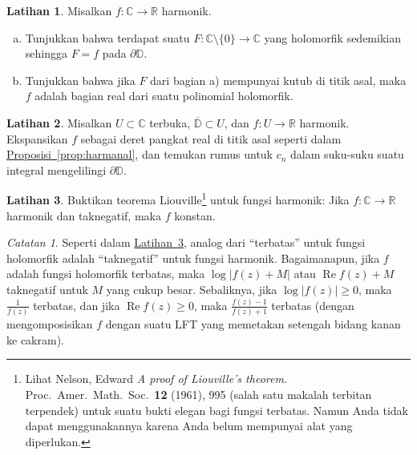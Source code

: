\documentclass[12pt,openany]{book}
\renewcommand{\Re}{\operatorname{Re}}
\newcommand{\sabs}[1]{\lvert {#1} \rvert}
\newcommand{\C}{{\mathbb{C}}}
\newcommand{\R}{{\mathbb{R}}}
\newcommand{\D}{{\mathbb{D}}}
\newcommand{\myquote}[1]{``#1''}
\theoremstyle{plain}
\theoremstyle{remark}
\newtheorem{remark}[thm]{Catatan}
\theoremstyle{definition}
\newenvironment{exbox}{%
    \def\FrameCommand{\vrule width 1pt \relax\hspace{10pt}}%
    \MakeFramed{\advance\hsize-\width\FrameRestore}%
}{%
    \endMakeFramed
}
\newenvironment{exparts}{%
    \leavevmode\begin{enumerate}[a),noitemsep,topsep=0pt,parsep=0pt,partopsep=0pt]
}{%
    \end{enumerate}
}
\theoremstyle{exercise}
\newtheorem{exercise}{Latihan}[section]
\theoremstyle{example}
\newcommand{\exerciseref}[1]{\hyperref[#1]{Latihan~\ref*{#1}}}
\newcommand{\propref}[1]{\hyperref[#1]{Proposisi~\ref*{#1}}}
\begin{document}
\begin{savenotes}
\begin{exbox}
\begin{exercise}
Misalkan $f \colon \C \to \R$ harmonik.
\begin{exparts}
\item
Tunjukkan bahwa terdapat
suatu $F \colon \C \setminus \{ 0 \} \to \C$ yang holomorfik
sedemikian sehingga $F=f$ pada $\partial \D$.
\item
Tunjukkan bahwa jika $F$ dari bagian a) mempunyai kutub di titik asal, maka $f$
adalah bagian real dari suatu polinomial holomorfik.
\end{exparts}
\end{exercise}

\begin{exercise}
Misalkan $U \subset \C$ terbuka, $\overline{\D} \subset U$,
dan $f \colon U \to \R$ harmonik. Ekspansikan
$f$ sebagai deret pangkat real di titik asal seperti dalam \propref{prop:harmanal}, dan temukan rumus
untuk $c_n$ dalam suku-suku
suatu integral mengelilingi $\partial \D$.
\end{exercise}

\begin{exercise}\label{exercise:Liouvilleharmonic}
\pagebreak[2]
Buktikan teorema Liouville\footnote{%
Lihat
Nelson, Edward
\emph{A proof of Liouville's theorem.}
Proc.\ Amer.\ Math.\ Soc.\ {\textbf{12}} (1961), 995
(salah satu makalah terbitan terpendek) untuk
suatu bukti elegan bagi fungsi terbatas.
Namun Anda tidak dapat menggunakannya karena Anda belum mempunyai
alat yang diperlukan.} untuk
fungsi harmonik: Jika $f \colon \C \to \R$ harmonik
dan taknegatif, maka $f$ konstan.
\end{exercise}
\end{exbox}
\end{savenotes}

\begin{remark}
Seperti dalam \exerciseref{exercise:Liouvilleharmonic},
analog dari \myquote{terbatas} untuk fungsi holomorfik adalah
\myquote{taknegatif}
untuk fungsi harmonik. Bagaimanapun, jika $f$ adalah
fungsi holomorfik terbatas, maka $\log \sabs{f(z)+M}$ atau $\Re f(z) + M$
taknegatif untuk $M$ yang cukup besar. Sebaliknya, jika $\log \sabs{f(z)} \geq
0$, maka $\frac{1}{f(z)}$ terbatas, dan jika $\Re f(z) \geq 0$, maka
$\frac{f(z)-1}{f(z)+1}$ terbatas (dengan mengomposisikan $f$ dengan suatu LFT yang memetakan
setengah bidang kanan ke cakram).
\end{remark}
\end{document}
